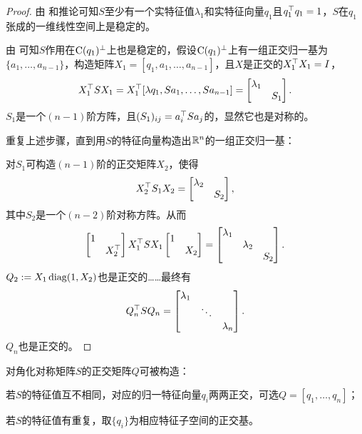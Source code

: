 \begin{proof}
	由 和推论可知$S$至少有一个实特征值$\lambda_1$和实特征向量$q_1$且$q_1^\top q_1=1$，$S$在$q_1$张成的一维线性空间上是稳定的。
	
	由 可知$S$作用在$\operatorname{C}(q_1)^\perp$上也是稳定的，假设$\operatorname{C}(q_1)^\perp$上有一组正交归一基为$\{a_1,\ldots,a_{n-1}\}$，构造矩阵$X_1=[q_1,a_1,\ldots,a_{n-1}]$，且$X$是正交的$X_1^\top X_1=I$，
	\[
		X_1^\top SX_1=X_1^\top[\lambda q_1,Sa_1,\ldots,Sa_{n-1}]=\begin{bmatrix}
			\lambda_1\\ &S_1
		\end{bmatrix}.
	\]
	$S_1$是一个$(n-1)$阶方阵，且$(S_1)_{ij}=a_i^\top Sa_j$的，显然它也是对称的。
	
	重复上述步骤，直到用$S$的特征向量构造出$\mathbb R^n$的一组正交归一基：
	
	对$S_1$可构造$(n-1)$阶的正交矩阵$X_2$，使得
	\[
		X_2^\top S_1X_2=\begin{bmatrix}
			\lambda_2\\ &S_2
		\end{bmatrix},
	\]
	其中$S_2$是一个$(n-2)$阶对称方阵。从而
	\[
		\begin{bmatrix}
			1\\ &X_2^\top
		\end{bmatrix}X_1^\top SX_1\begin{bmatrix}
			1\\ &X_2
		\end{bmatrix}=\begin{bmatrix}
			\lambda_1\\ &\lambda_2\\ &&S_2
		\end{bmatrix}.
	\]
	$Q_2:=X_1\operatorname{diag}(1, X_2)$也是正交的……最终有
	\[
		Q_n^\top SQ_n=\begin{bmatrix}
			\lambda_1\\ &\ddots\\ &&\lambda_n
		\end{bmatrix}.
	\]
	$Q_n$也是正交的。
\end{proof}

对角化对称矩阵$S$的正交矩阵$Q$可被构造：
\begin{compactitem}
	\item 若$S$的特征值互不相同，对应的归一特征向量$q_i$两两正交，可选$Q=[q_1,\ldots,q_n]$；
	\item 若$S$的特征值有重复，取$\{q_i\}$为相应特征子空间的正交基。
\end{compactitem}

